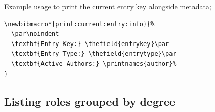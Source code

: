 \documentclass[12pt, twoside]{article}
\begin{document}
Example usage to print the current entry key alongside metadata;
\begin{lstlisting}[style=latexExampleForAuthors, escapechar=|, basicstyle=\footnotesize, caption={{Print current entry key with metadata}}, label=lst:biberPrintCurrentEntry]
\newbibmacro*{print:current:entry:info}{%
  \par\noindent
  \textbf{Entry Key:} \thefield{entrykey}\par
  \textbf{Entry Type:} \thefield{entrytype}\par
  \textbf{Active Authors:} \printnames{author}%
}
\end{lstlisting}

\subsection{Listing roles grouped by degree}
\end{document}
